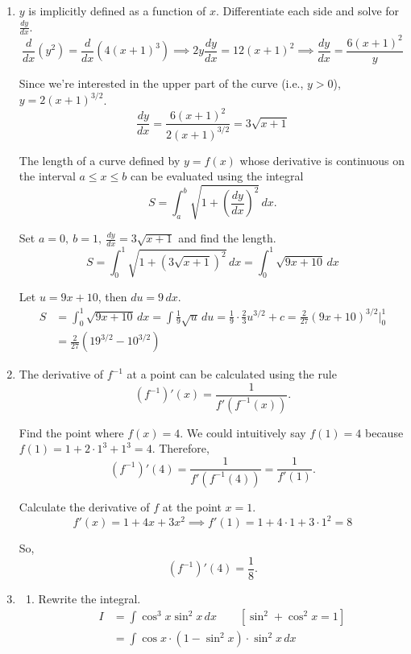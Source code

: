 \documentclass[a4paper, 12pt]{article}
\renewcommand{\headrulewidth}{0pt}
\begin{document}
\newpage
\pagestyle{fancy}
\renewcommand{\headrulewidth}{1pt}


\begin{enumerate}[leftmargin=*,label=\textbf{\arabic*.}]
\item $y$ is implicitly defined as a function of $x$. Differentiate each side and solve for $\displaystyle \frac{dy}{dx}$.
\[\frac d{dx}\left(y^2\right)=\frac d{dx}\left(4(x+1)^3\right)\implies 2y\frac{dy}{dx}=12(x+1)^2\implies\frac{dy}{dx}=\frac{6(x+1)^2}y\]

Since we're interested in the upper part of the curve (i.e., $y>0$), $y=2(x+1)^{3/2}$.
\[\frac{dy}{dx}=\frac{6(x+1)^2}{2(x+1)^{3/2}}=3\sqrt{x+1}\]

The length of a curve defined by $y=f(x)$ whose derivative is continuous on the interval $a\leq x\leq b$ can be evaluated using the integral
\[S=\int_a^b\sqrt{1+\left(\frac{dy}{dx}\right)^2}\,dx.\]

Set $\displaystyle a=0,\:b=1,\:\frac{dy}{dx}=3\sqrt{x+1}$ and find the length.
\[S=\int_0^1\sqrt{1+\left(3\sqrt{x+1}\right)^2}\,dx=\int_0^1\sqrt{9x+10}\,dx\]

Let $u=9x+10$, then $du=9\,dx$.
\begin{align*}
S&=\int_0^1\sqrt{9x+10}\,dx=\int\frac19\sqrt{u}\,du=\frac19\cdot\frac23u^{3/2}+c=\frac2{27}\left(9x+10\right)^{3/2}\bigg|_0^1\\[1em]&=\boxed{\frac2{27}\left(19^{3/2}-10^{3/2}\right)}
\end{align*}

\item The derivative of $f^{-1}$ at a point can be calculated using the rule
\[\left(f^{-1}\right)'(x)=\frac1{f'\left(f^{-1}(x)\right)}.\]

Find the point where $f(x)=4$. We could intuitively say $f(1)=4$ because $f(1)=1+2\cdot1^3+1^3=4$. Therefore,
\[\left(f^{-1}\right)'\left(4\right)=\frac1{f'\left(f^{-1}(4)\right)}=\frac1{f'(1)}.\]

Calculate the derivative of $f$ at the point $x=1$.
\[f'(x)=1+4x+3x^2\implies f'(1)=1+4\cdot1+3\cdot1^2=8\]

So,
\[\left(f^{-1}\right)'\left(4\right)=\boxed{\frac18}.\]

\item \begin{enumerate}[leftmargin=*,label=\textbf{\alph*.}]
\item Rewrite the integral.
\begin{align*}
I&=\int\cos^3x\sin^2x\,dx\qquad\left[\sin^2+\cos^2x=1\right]\\[1em]&=\int\cos x\cdot\left(1-\sin^2x\right)\cdot\sin^2x\,dx
\end{align*}


\end{enumerate}
\end{enumerate}
\end{document}
